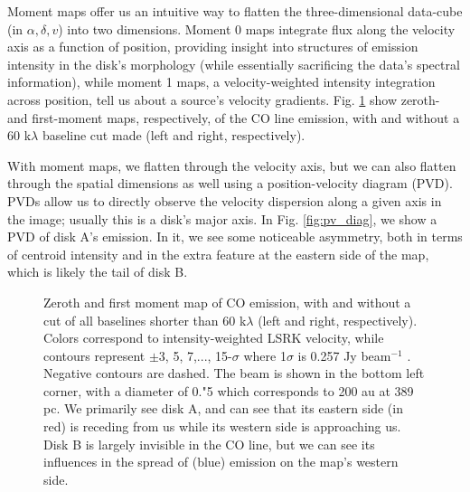 Moment maps offer us an intuitive way to flatten the three-dimensional data-cube (in $\alpha, \delta, v$) into two dimensions. Moment 0 maps integrate flux along the velocity axis as a function of position, providing insight into structures of emission intensity in the disk's morphology (while essentially sacrificing the data's spectral information), while moment 1 maps, a velocity-weighted intensity integration across position, tell us about a source's velocity gradients. Fig. \ref{fig:co_moments} show zeroth- and first-moment maps, respectively, of the CO line emission, with and without a 60 k$\lambda$ baseline cut made (left and right, respectively).



With moment maps, we flatten through the velocity axis, but we can also flatten through the spatial dimensions as well using a position-velocity diagram (PVD). PVDs allow us to directly observe the velocity dispersion along a given axis in the image; usually this is a disk's major axis. In Fig. \ref{fig:pv_diag}, we show a PVD of disk A's \hco emission. In it, we see some noticeable asymmetry, both in terms of centroid intensity and in the extra feature at the eastern side of the map, which is likely the tail of disk B.


\begin{figure}[h]
  \hspace*{\fill}%
  \vfill%
  \hspace*{\fill}%
  \caption{Zeroth and first moment map of CO emission, with and without a cut of all baselines shorter than 60 k$\lambda$ (left and right, respectively). Colors correspond to intensity-weighted LSRK velocity, while contours represent $\pm$3, 5, 7,..., 15-$\sigma$ where 1$\sigma$ is 0.257 Jy beam$^{-1}$ \kms. Negative contours are dashed. The beam is shown in the bottom left corner, with a diameter of 0."5 which corresponds to 200 au at 389 pc. We primarily see disk A, and can see that its eastern side (in red) is receding from us while its western side is approaching us. Disk B is largely invisible in the CO line, but we can see its influences in the spread of (blue) emission on the map's western side.}
  \label{fig:co_moments}
\end{figure}

